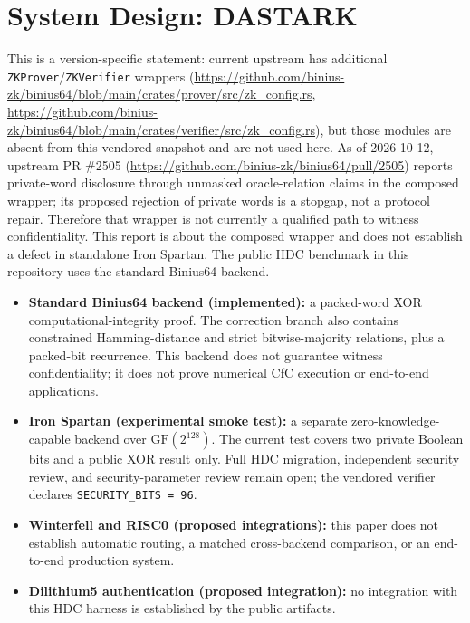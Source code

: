 \documentclass[11pt,twocolumn]{article}
\begin{document}
\section{System Design: DASTARK}
\label{sec:system}

This is a version-specific statement: current upstream has additional \texttt{ZKProver}/\texttt{ZKVerifier} wrappers (\url{https://github.com/binius-zk/binius64/blob/main/crates/prover/src/zk_config.rs}, \url{https://github.com/binius-zk/binius64/blob/main/crates/verifier/src/zk_config.rs}), but those modules are absent from this vendored snapshot and are not used here. As of 2026-10-12, upstream PR \#2505 (\url{https://github.com/binius-zk/binius64/pull/2505}) reports private-word disclosure through unmasked oracle-relation claims in the composed wrapper; its proposed rejection of private words is a stopgap, not a protocol repair. Therefore that wrapper is not currently a qualified path to witness confidentiality. This report is about the composed wrapper and does not establish a defect in standalone Iron Spartan. The public HDC benchmark in this repository uses the standard Binius64 backend.

\begin{itemize}
    \item \textbf{Standard Binius64 backend (implemented):} a packed-word XOR computational-integrity proof. The correction branch also contains constrained Hamming-distance and strict bitwise-majority relations, plus a packed-bit recurrence. This backend does not guarantee witness confidentiality; it does not prove numerical CfC execution or end-to-end applications.
    \item \textbf{Iron Spartan (experimental smoke test):} a separate zero-knowledge-capable backend over $\mathrm{GF}(2^{128})$. The current test covers two private Boolean bits and a public XOR result only. Full HDC migration, independent security review, and security-parameter review remain open; the vendored verifier declares \texttt{SECURITY\_BITS = 96}.
    \item \textbf{Winterfell and RISC0 (proposed integrations):} this paper does not establish automatic routing, a matched cross-backend comparison, or an end-to-end production system.
    \item \textbf{Dilithium5 authentication (proposed integration):} no integration with this HDC harness is established by the public artifacts.
\end{itemize}
\end{document}
